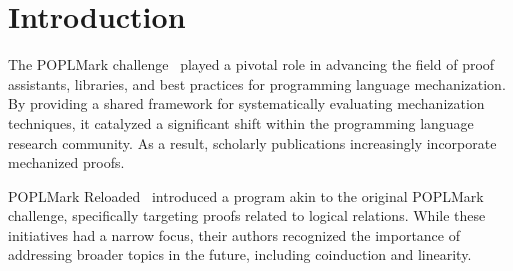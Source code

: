 \documentclass[runningheads]{llncs}
\begin{document}
\section{Introduction}

The POPLMark challenge~\cite{POPLMark}
played a pivotal role in advancing the field of proof assistants,
libraries, and best practices for programming language
mechanization. By providing a shared framework for systematically
evaluating mechanization techniques, it catalyzed a significant
shift within the programming language research community. As a
result, scholarly publications increasingly incorporate
mechanized proofs.
%

POPLMark Reloaded~\cite{POPLMarkReloaded} introduced a program akin to
the original POPLMark challenge, specifically targeting proofs related
to logical relations. While these initiatives had a narrow focus,
their authors recognized the importance of addressing broader topics
in the future, including coinduction and linearity.
\end{document}
